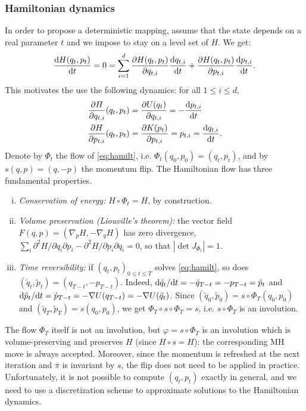 \documentclass[english,graybox,envcountchap,envcountsame,sectrefs,shortlabels]{svmono}
\theoremstyle{style}
\newcommand{\eqsp}{}
\begin{document}
\subsubsection*{Hamiltonian dynamics}
In order to propose a deterministic mapping, assume that the state depends on a real parameter $t$ and we impose to stay on a level set of $H$. We get:
$$
\frac{\rmd H(q_t,p_t)}{\rmd t}=0=\sum_{i=1}^d \frac{\partial H(q_t,p_t)}{\partial q_{t,i}} \frac{\rmd q_{t,i}}{\rmd t}+\frac{\partial H(q_t,p_t)}{\partial p_{t,i}} \frac{\rmd p_{t,i}}{\rmd t}\eqsp.
$$
This motivates the use the following dynamics: for all $1\leq i \leq d$,
\begin{align}
\frac{\partial H}{\partial q_{t,i}}(q_t,p_t)&=\frac{\partial U(q_t)}{\partial q_{t,i}}=-\frac{\rmd p_{t,i}}{\rmd t} \nonumber\\
\frac{\partial H}{\partial p_{t,i}}(q_t,p_t)&=\frac{\partial K(p_t)}{\partial p_{t,i}}=p_{t,i}=\frac{\rmd q_{t,i}}{\rmd t} \eqsp.\label{eq:hamilt}
\end{align}
Denote by $\Phi_t$ the flow of \eqref{eq:hamilt}, i.e. $\Phi_t(q_0,p_0) = (q_t,p_t)$, and by $s(q,p) = (q,-p)$ the momentum flip. The Hamiltonian flow has three fundamental properties.
\begin{enumerate}[i)]
\item \emph{Conservation of energy:} $H\circ\Phi_t = H$, by construction.
\item \emph{Volume preservation (Liouville's theorem):} the vector field $F(q,p) = (\nabla_p H,-\nabla_q H)$ has zero divergence, $\sum_{i}\partial^2H/\partial q_i\partial p_i - \partial^2 H/\partial p_i\partial q_i = 0$, so that $|\det J_{\Phi_t}| = 1$.
\item \emph{Time reversibility:} if $(q_t,p_t)_{0\leq t\leq T}$ solves \eqref{eq:hamilt}, so does $(\tilde q_t,\tilde p_t) = (q_{T-t},-p_{T-t})$. Indeed, $\mathrm{d} \tilde q_t/\mathrm{d} t = -\dot q_{T-t} = -p_{T-t} = \tilde p_t$ and $\mathrm{d} \tilde p_t/\mathrm{d} t = \dot p_{T-t} = -\nabla U(q_{T-t}) = -\nabla U(\tilde q_t)$. Since $(\tilde q_0,\tilde p_0) = s\circ\Phi_T(q_0,p_0)$ and $(\tilde q_T,\tilde p_T) = s(q_0,p_0)$, we get $\Phi_T\circ s\circ\Phi_T = s$, i.e. $s\circ\Phi_T$ is an involution.
\end{enumerate}
The flow $\Phi_T$ itself is not an involution, but $\varphi = s\circ\Phi_T$ is an involution which is volume-preserving and preserves $H$ (since $H\circ s = H$): the corresponding MH move is always accepted. Moreover, since the momentum is refreshed at the next iteration and $\bar\pi$ is invariant by $s$, the flip does not need to be applied in practice. Unfortunately, it is not possible to compute $(q_t,p_t)$ exactly in general, and we need to use a discretization scheme to approximate solutions to the Hamiltonian dynamics.
\end{document}
